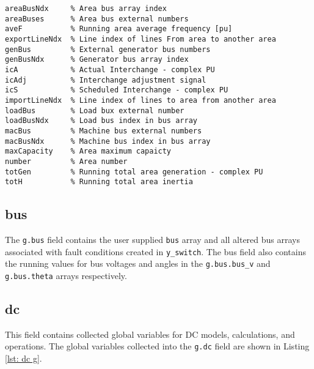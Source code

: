 \begin{lstlisting}[caption={Area Global Field Variables},label={lst: area g}]
\end{lstlisting}\vspace{-2 em}
\begin{verbatim}
areaBusNdx     % Area bus array index
areaBuses      % Area bus external numbers
aveF           % Running area average frequency [pu]
exportLineNdx  % Line index of lines From area to another area
genBus         % External generator bus numbers
genBusNdx      % Generator bus array index
icA            % Actual Interchange - complex PU
icAdj          % Interchange adjustment signal
icS            % Scheduled Interchange - complex PU
importLineNdx  % Line index of lines to area from another area
loadBus        % Load bux external number
loadBusNdx     % Load bus index in bus array
macBus         % Machine bus external numbers
macBusNdx      % Machine bus index in bus array
maxCapacity    % Area maximum capaicty
number         % Area number
totGen         % Running total area generation - complex PU
totH           % Running total area inertia
\end{verbatim}

\subsection{bus}  
The \verb|g.bus| field contains the user supplied \verb|bus| array and all altered bus arrays associated with fault conditions created in \verb|y_switch|.
The bus field also contains the running values for bus voltages and angles in the \verb|g.bus.bus_v| and \verb|g.bus.theta| arrays respectively.

\pagebreak
\subsection{dc}
This field contains collected global variables for DC models, calculations, and operations.
The global variables collected into the \verb|g.dc| field are shown in Listing \ref{lst: dc g}.

